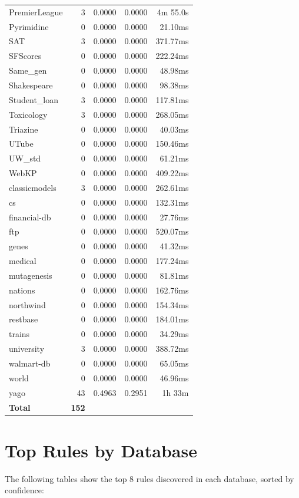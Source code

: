 \documentclass[11pt,a4paper]{article}
\begin{document}
\begin{table}[h!]
\begin{tabular}{|l|r|r|r|r|}
PremierLeague & 3 & 0.0000 & 0.0000 & 4m 55.0s \\
Pyrimidine & 0 & 0.0000 & 0.0000 & 21.10ms \\
SAT & 3 & 0.0000 & 0.0000 & 371.77ms \\
SFScores & 0 & 0.0000 & 0.0000 & 222.24ms \\
Same_gen & 0 & 0.0000 & 0.0000 & 48.98ms \\
Shakespeare & 0 & 0.0000 & 0.0000 & 98.38ms \\
Student_loan & 3 & 0.0000 & 0.0000 & 117.81ms \\
Toxicology & 3 & 0.0000 & 0.0000 & 268.05ms \\
Triazine & 0 & 0.0000 & 0.0000 & 40.03ms \\
UTube & 0 & 0.0000 & 0.0000 & 150.46ms \\
UW_std & 0 & 0.0000 & 0.0000 & 61.21ms \\
WebKP & 0 & 0.0000 & 0.0000 & 409.22ms \\
classicmodels & 3 & 0.0000 & 0.0000 & 262.61ms \\
cs & 0 & 0.0000 & 0.0000 & 132.31ms \\
financial-db & 0 & 0.0000 & 0.0000 & 27.76ms \\
ftp & 0 & 0.0000 & 0.0000 & 520.07ms \\
genes & 0 & 0.0000 & 0.0000 & 41.32ms \\
medical & 0 & 0.0000 & 0.0000 & 177.24ms \\
mutagenesis & 0 & 0.0000 & 0.0000 & 81.81ms \\
nations & 0 & 0.0000 & 0.0000 & 162.76ms \\
northwind & 0 & 0.0000 & 0.0000 & 154.34ms \\
restbase & 0 & 0.0000 & 0.0000 & 184.01ms \\
trains & 0 & 0.0000 & 0.0000 & 34.29ms \\
university & 3 & 0.0000 & 0.0000 & 388.72ms \\
walmart-db & 0 & 0.0000 & 0.0000 & 65.05ms \\
world & 0 & 0.0000 & 0.0000 & 46.96ms \\
yago & 43 & 0.4963 & 0.2951 & 1h 33m \\
\hline
\textbf{Total} & \textbf{152} & & & \\
\hline
\end{tabular}
\end{table}

\section{Top Rules by Database}
The following tables show the top 8 rules discovered in each database, sorted by confidence:
\end{document}
